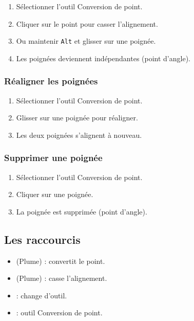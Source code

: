 \begin{enumerate}
    \item Sélectionner l'outil Conversion de point.
    \item Cliquer sur le point pour casser l'alignement.
    \item Ou maintenir \texttt{Alt} et glisser sur une poignée.
    \item Les poignées deviennent indépendantes (point d'angle).
\end{enumerate}

\subsubsection{Réaligner les poignées}

\begin{enumerate}
    \item Sélectionner l'outil Conversion de point.
    \item Glisser sur une poignée pour réaligner.
    \item Les deux poignées s'alignent à nouveau.
\end{enumerate}

\subsubsection{Supprimer une poignée}

\begin{enumerate}
    \item Sélectionner l'outil Conversion de point.
    \item Cliquer sur une poignée.
    \item La poignée est supprimée (point d'angle).
\end{enumerate}

\subsection{Les raccourcis}

\begin{itemize}
    \item {} (Plume) : convertit le point.
    \item {} (Plume) : casse l'alignement.
    \item {} : change d'outil.
    \item {} : outil Conversion de point.
\end{itemize}

